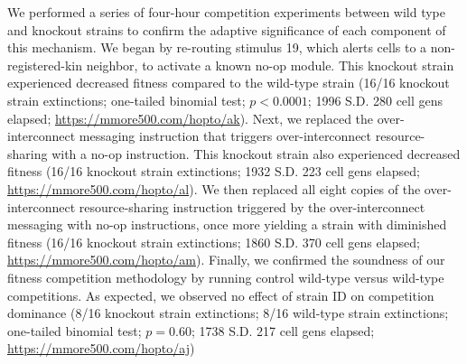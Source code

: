 We performed a series of four-hour competition experiments between wild type and knockout strains to confirm the adaptive significance of each component of this mechanism.
We began by re-routing stimulus 19, which alerts cells to a non-registered-kin  neighbor, to activate a known no-op module.
This knockout strain experienced decreased fitness compared to the wild-type strain (16/16 knockout strain extinctions; one-tailed binomial test; $p < 0.0001$; 1996 S.D. 280 cell gens elapsed; \url{https://mmore500.com/hopto/ak}).
Next, we replaced the over-interconnect messaging instruction that triggers over-interconnect resource-sharing with a no-op instruction.
This knockout strain also experienced decreased fitness (16/16 knockout strain extinctions; 1932 S.D. 223 cell gens elapsed; \url{https://mmore500.com/hopto/al}).
We then replaced all eight copies of the over-interconnect resource-sharing instruction triggered by the over-interconnect messaging with no-op instructions, once more yielding a strain with diminished fitness (16/16 knockout strain extinctions; 1860 S.D. 370 cell gens elapsed; \url{https://mmore500.com/hopto/am}).
Finally, we confirmed the soundness of our fitness competition methodology by running control wild-type versus wild-type competitions.
As expected, we observed no effect of strain ID on competition dominance (8/16 knockout strain extinctions; 8/16 wild-type strain extinctions; one-tailed binomial test; $p = 0.60$; 1738 S.D. 217 cell gens elapsed; \url{https://mmore500.com/hopto/aj})




